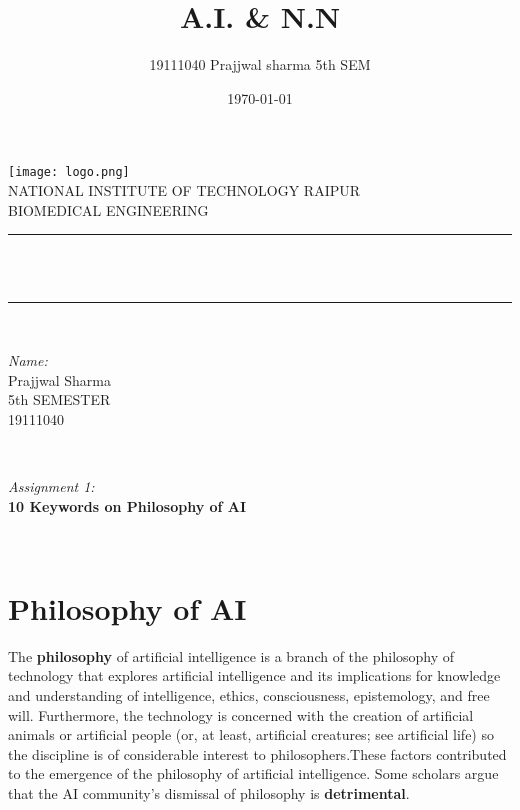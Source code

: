 \documentclass[12pt]{article}
\title{A.I. \&  N.N}								%
\author{19111040 Prajjwal sharma 5th SEM}								%
\date{\today}											%
\makeatletter
\let\thetitle\@title
\makeatother
\begin{document}

\begin{titlepage}
	\centering
    \vspace*{0.5 cm}
    \texttt{[image: logo.png]}\\[1.0 cm]	%
    \textsc{\Large \newline NATIONAL INSTITUTE OF TECHNOLOGY RAIPUR}\\[2.0 cm]	%
	\textsc{\Large BIOMEDICAL ENGINEERING}\\[0.5 cm]				%
	\rule{\linewidth}{0.2 mm} \\[0.4 cm]
	{ \huge \bfseries \thetitle}\\
	\rule{\linewidth}{0.2 mm} \\[1.5 cm]
	
	\begin{minipage}{0.5\textwidth}
		\begin{flushleft} \large
			\emph{Name:}\\
			Prajjwal Sharma\\
            5th SEMESTER\\
            19111040\\
			\end{flushleft}
			\end{minipage}~
			\begin{minipage}{0.4\textwidth}
            
			\begin{flushright} \large
			\emph{Assignment 1:} \\
				\bf{10 Keywords on Philosophy of AI}
		\end{flushright}
        
	\end{minipage}\\[2 cm]
	
	

    
    
    
	
\end{titlepage}






\section{Philosophy of AI}
\small The \textbf{philosophy} of artificial intelligence is a branch of the philosophy of technology that explores artificial intelligence and its implications for knowledge and understanding of intelligence, ethics, consciousness, epistemology, and free will. Furthermore, the technology is concerned with the creation of artificial animals or artificial people (or, at least, artificial creatures; see artificial life) so the discipline is of considerable interest to philosophers.These factors contributed to the emergence of the philosophy of artificial intelligence. Some scholars argue that the AI community's dismissal of philosophy is \textbf{detrimental}.
\end{document}
